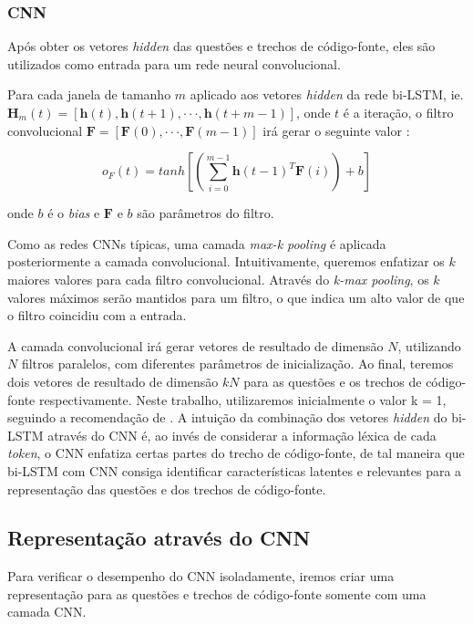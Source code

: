 \subsubsection{CNN}
\label{sec:representation-cnn}

Após obter os vetores \textit{hidden} das questões e trechos de código-fonte, eles são utilizados como entrada para um rede neural convolucional. 

Para cada janela de tamanho $m$ aplicado aos vetores \textit{hidden} da rede bi-LSTM, ie. 
$\bm{H}_{m}(t) = [\bm{h}(t), \bm{h}(t + 1), · · · , \bm{h}(t + m − 1)]$, onde $t$ é a iteração, o filtro convolucional $\bm{F}  = [\bm{F}(0),· · ·, \bm{F}(m − 1)]$ irá gerar o seguinte valor \citep{tan-lstm-qa}:

\begin{equation}
    o_{F}(t) = tanh \left[\left(\sum_{i=0}^{m - 1} \bm{h}(t-1)^{T}\bm{F}(i)\right) + b\right]
\end{equation}

onde $b$ é o \textit{bias} e $\bm{F}$ e $b$ são parâmetros do filtro.

Como as redes CNNs típicas, uma camada \textit{max-k pooling} é aplicada posteriormente a camada convolucional. Intuitivamente, queremos enfatizar os $k$ maiores valores para cada filtro convolucional. Através do \textit{k-max pooling}, os $k$ valores máximos serão mantidos para um filtro, o que indica um alto valor de que o filtro coincidiu com a entrada. 

A camada convolucional irá gerar vetores de resultado de dimensão $N$, utilizando $N$ filtros paralelos, com diferentes parâmetros de inicialização. Ao final, teremos dois vetores de resultado de dimensão $kN$ para as questões e os trechos de código-fonte respectivamente. Neste trabalho, utilizaremos inicialmente o valor k = 1, seguindo a recomendação de \cite{tan-lstm-qa}. A intuição da combinação dos vetores \textit{hidden} do bi-LSTM através do CNN é, ao invés de considerar a informação léxica de cada \textit{token}, o CNN enfatiza certas partes do trecho de código-fonte, de tal maneira que bi-LSTM com CNN consiga identificar características latentes e relevantes para a representação das questões e dos trechos de código-fonte.


\subsection{Representação através do CNN}

Para verificar o desempenho do CNN isoladamente, iremos criar uma representação para as questões e trechos de código-fonte somente com uma camada CNN.

